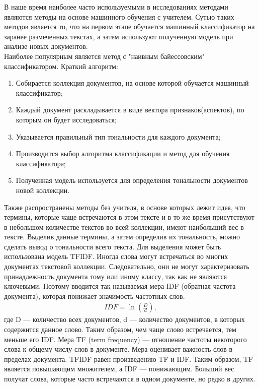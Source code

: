 \documentclass[a4paper,12pt]{report}
\begin{document}
\begin{itemize}
\hspace{0.6cm}В наше время наиболее часто используемыми в исследованиях методами являются методы на основе машинного обучения с учителем. Сутью таких методов является то, что на первом этапе обучается машинный классификатор на заранее размеченных текстах, а затем используют полученную модель при анализе новых документов.\\
Наиболее популярным является метод с "наивным байессовским" классификатором. Краткий алгоритм:
\begin{enumerate}
\item Собирается коллекция документов, на основе которой обучается машинный классификатор;
\item Каждый документ раскладывается в виде вектора признаков(аспектов), по которым он будет исследоваться;
\item Указывается правильный тип тональности для каждого документа;
\item Производится выбор алгоритма классификации и метод для обучения классификатора;
\item Полученная модель используется для определения тональности документов новой коллекции.
\end{enumerate}
\hspace{0.6cm}Также распространены методы без учителя, в основе которых лежит идея, что термины, которые чаще встречаются в этом тексте и в то же время присутствуют в небольшом количестве текстов во всей коллекции, имеют наибольший вес в тексте. Выделив данные термины, а затем определив их тональность, можно сделать вывод о тональности всего текста. Для выделения может быть использована модель TFIDF.
Иногда слова могут встречаться во многих документах текстовой коллекции. Следовательно, они не могут характеризовать принадлежность документа тому или иному классу, так как не являются ключевыми. Поэтому вводится так называемая мера IDF (обратная частота документа), которая понижает значимость частотных слов.
\begin{align}
IDF = \ln(\frac{D}{d}),
\end{align}
где D — количество всех документов, d — количество документов, в которых содержится данное слово. Таким образом, чем чаще слово встречается, тем меньше его IDF.
Мера TF (term frequency) — отношение частоты некоторого слова к общему числу слов в документе. Мера оценивает важность слов в пределах документа.
TFIDF равен произведению TF и IDF. Таким образом, TF является повышающим множителем, а IDF — понижающим. Больший вес получат слова, которые часто встречаются в одном документе, но редко в других.
\end{itemize}
\end{document}
